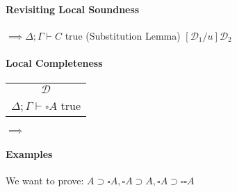 \documentclass[12 pt]{article}
\begin{document}
\paragraph{Revisiting Local Soundness}
\begin{center}
	\noLine
	\noLine
	\DP
	$\implies \Delta; \Gamma \vdash C$ true (Substitution Lemma) $[\mathcal{D}_1/u]\mathcal{D_2}$
\end{center}
\paragraph{Local Completeness}
\begin{center}
	\begin{tabular}{c}
		$\mathcal{D}$
		\\ $\Delta; \Gamma \vdash \square A$ true
	\end{tabular}
	$\implies$
	\noLine
	\DP
\end{center}
\paragraph{Examples}
We want to prove: $A \supset \square A, \square A
	\supset A, \square A \supset \square \square A$
\end{document}
